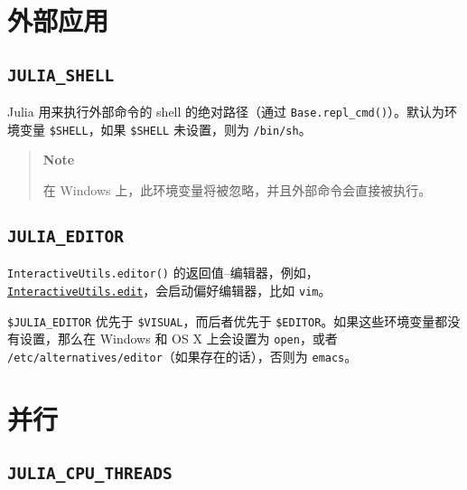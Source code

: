\hypertarget{3466341700032254278}{}


\section{外部应用}



\hypertarget{12177211249965413749}{}


\subsection{\texttt{JULIA\_SHELL}}



Julia 用来执行外部命令的 shell 的绝对路径（通过 \texttt{Base.repl\_cmd()}）。默认为环境变量 \texttt{\$SHELL}，如果 \texttt{\$SHELL} 未设置，则为 \texttt{/bin/sh}。



\begin{quote}
\textbf{Note}

在 Windows 上，此环境变量将被忽略，并且外部命令会直接被执行。

\end{quote}


\hypertarget{327473439132778011}{}


\subsection{\texttt{JULIA\_EDITOR}}



\texttt{InteractiveUtils.editor()} 的返回值–编辑器，例如，\hyperlink{7452583831414689960}{\texttt{InteractiveUtils.edit}}，会启动偏好编辑器，比如 \texttt{vim}。



\texttt{\$JULIA\_EDITOR} 优先于 \texttt{\$VISUAL}，而后者优先于 \texttt{\$EDITOR}。如果这些环境变量都没有设置，那么在 Windows 和 OS X 上会设置为 \texttt{open}，或者 \texttt{/etc/alternatives/editor}（如果存在的话），否则为 \texttt{emacs}。



\hypertarget{5963067566394654848}{}


\section{并行}



\hypertarget{9501730119086472793}{}


\subsection{\texttt{JULIA\_CPU\_THREADS}}



